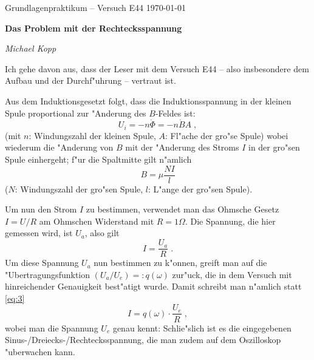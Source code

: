 \documentclass[a4paper,12pt]{article}
\newcommand{\abs}[0]{\bigskip\noindent}
\begin{document}
\newcommand{\NAME}{Michael Kopp}
\newcommand{\FACH}{Grundlagenpraktikum -- Versuch E44}
\newcommand{\TITEL}{Das Problem mit der Rechtecksspannung}
\newcommand{\DATUM}{\today}


\pagestyle{plain} 




\sloppy

\begin{center}
\FACH
\hfill
\DATUM
\end{center}

\vspace{-5mm} %

\begin{center}
  \begin{Large}
 \textbf{\TITEL}
  \end{Large}
\end{center}

\vspace{-3mm}

\begin{center}
\hrulefill
\quad 
\textit{\NAME}
\,
\hrulefill
\end{center}
 
 

\noindent
Ich gehe davon aus, dass der Leser mit dem Versuch E44 -- also
insbesondere dem Aufbau und der Durchf"uhrung -- vertraut ist.

\abs
Aus dem Induktionsgesetzt folgt, dass die Induktionsspannung in der
kleinen Spule proportional zur "Anderung des $B$-Feldes ist:
\begin{equation}
  \label{eq:1}
  U_i = - n \dot \Phi = - n \dot B A \;,
\end{equation}
(mit $n$: Windungszahl der kleinen Spule, $A$: Fl"ache der gro"se
Spule) wobei wiederum die "Anderung von $B$ mit der "Anderung des Stroms $I$ in
der gro"sen Spule einhergeht; f"ur die Spaltmitte gilt n"amlich
\begin{equation}
  \label{eq:2}
  B = \mu \frac{ N I }{l}
\end{equation}
($N$: Windungszahl der gro"sen Spule, $l$: L"ange der gro"sen Spule).

Um nun den Strom $I$ zu bestimmen, verwendet man das Ohmsche Gesetz $I
= U / R$ am Ohmschen Widerstand mit $R = 1 \Omega$. Die Spannung, die
hier gemessen wird, ist $U_a$, also gilt
\begin{equation}
  \label{eq:3}
  I = \frac{U_a}{R} \;.
\end{equation}
Um diese Spannung $U_a$ nun bestimmen zu k"onnen, greift man auf die
"Ubertragungsfunktion $(U_a / U_e) = :q(\omega)$ zur"uck, die in dem
Versuch mit hinreichender Genauigkeit best"atigt wurde. Damit schreibt
man n"amlich statt \eqref{eq:3}
\begin{equation}
  \label{eq:4}
  I = q(\omega) \cdot \frac{U_e}{R} \;,
\end{equation}
wobei man die Spannung $U_e$ genau kennt: Schlie"slich ist es die
eingegebenen Sinus-/Dreiecks-/Rechtecksspannung, die man zudem auf dem
Oszilloskop "uberwachen kann.
\end{document}

